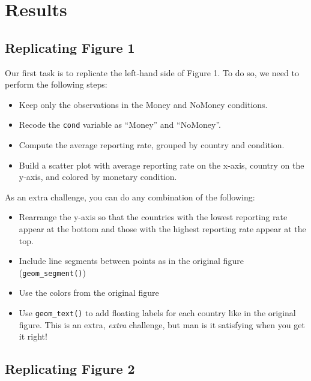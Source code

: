 \documentclass[12pt,halfline,a4paper,]{ouparticle}
\providecommand{\tightlist}{%
  \setlength{\itemsep}{0pt}\setlength{\parskip}{0pt}}
\begin{document}
\hypertarget{results}{%
\section{Results}\label{results}}

\hypertarget{replicating-figure-1}{%
\subsection{Replicating Figure 1}\label{replicating-figure-1}}

Our first task is to replicate the left-hand side of Figure 1. To do so,
we need to perform the following steps:

\begin{itemize}
\tightlist
\item
  Keep only the observations in the Money and NoMoney conditions.
\item
  Recode the \texttt{cond} variable as ``Money'' and ``NoMoney''.
\item
  Compute the average reporting rate, grouped by country and condition.
\item
  Build a scatter plot with average reporting rate on the x-axis,
  country on the y-axis, and colored by monetary condition.
\end{itemize}

\noindent As an extra challenge, you can do any combination of the
following:

\begin{itemize}
\tightlist
\item
  Rearrange the y-axis so that the countries with the lowest reporting
  rate appear at the bottom and those with the highest reporting rate
  appear at the top.
\item
  Include line segments between points as in the original figure
  (\texttt{geom\_segment()})
\item
  Use the colors from the original figure
\item
  Use \texttt{geom\_text()} to add floating labels for each country like
  in the original figure. This is an extra, \emph{extra} challenge, but
  man is it satisfying when you get it right!
\end{itemize}

\hypertarget{replicating-figure-2}{%
\subsection{Replicating Figure 2}\label{replicating-figure-2}}
\end{document}
